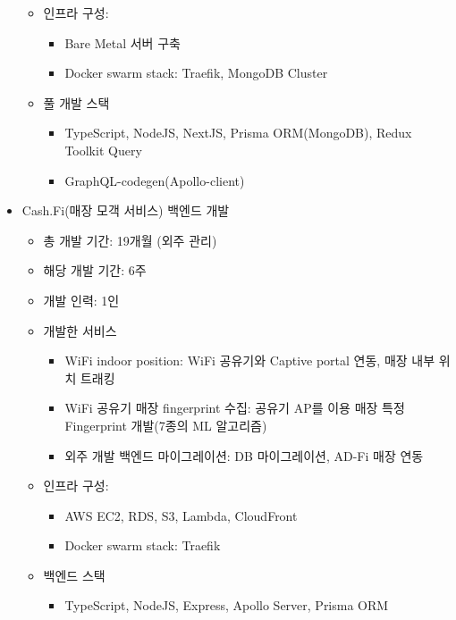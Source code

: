 \begin{itemize}
\begin{itemize}[label=$\star$]
\begin{itemize}
		            \end{itemize}
		      \item 인프라 구성:
		            \begin{itemize}
			            \item Bare Metal 서버 구축
			            \item Docker swarm stack: Traefik, MongoDB Cluster
		            \end{itemize}
		      \item 풀 개발 스택
		            \begin{itemize}
			            \item TypeScript, NodeJS, NextJS, Prisma ORM(MongoDB), Redux Toolkit Query
			            \item GraphQL-codegen(Apollo-client)
		            \end{itemize}
	      \end{itemize}
	\item Cash.Fi(매장 모객 서비스) 백엔드 개발
	      \begin{itemize}[label=$\star$]
		      \item 총 개발 기간: 19개월 (외주 관리)
          \item 해당 개발 기간: 6주
		      \item 개발 인력: 1인
		      \item 개발한 서비스
		            \begin{itemize}
			            \item WiFi indoor position: WiFi 공유기와 Captive portal 연동, 매장 내부 위치 트래킹
			            \item WiFi 공유기 매장 fingerprint 수집: 공유기 AP를 이용 매장 특정 Fingerprint 개발(7종의 ML 알고리즘)
			            \item 외주 개발 백엔드 마이그레이션: DB 마이그레이션, AD-Fi 매장 연동
		            \end{itemize}
		      \item 인프라 구성:
		            \begin{itemize}
			            \item AWS EC2, RDS, S3, Lambda, CloudFront
			            \item Docker swarm stack: Traefik
		            \end{itemize}
		      \item 백엔드 스택
		            \begin{itemize}
			            \item TypeScript, NodeJS, Express, Apollo Server, Prisma ORM

\end{itemize}
\end{itemize}
\end{itemize}
